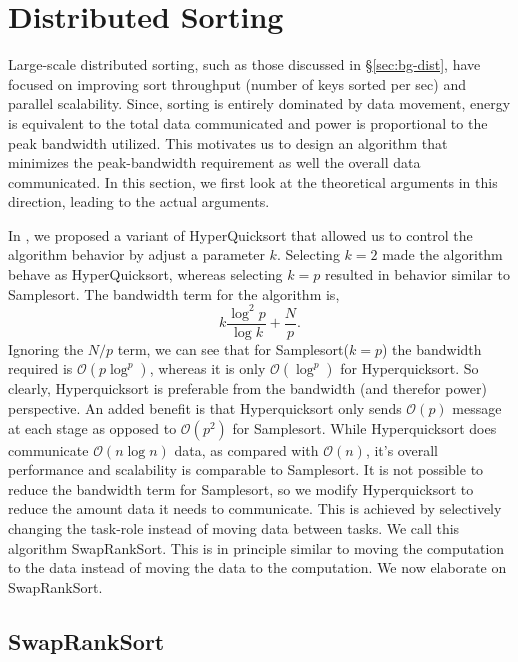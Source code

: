 \section{Distributed Sorting}
\label{sec:dsort}

Large-scale distributed sorting, such as those discussed in \S\ref{sec:bg-dist}, have focused on improving sort throughput (number of keys sorted per sec) and parallel scalability. Since, sorting is entirely dominated by data movement, energy is equivalent to the total data communicated and power is proportional to the peak bandwidth utilized. This motivates us to design an algorithm that minimizes the peak-bandwidth requirement as well the overall data communicated. In this section, we first look at the theoretical arguments in this direction, leading to the actual arguments. 

In \cite{hyksort}, we proposed a variant of HyperQuicksort\cite{wagar87} that allowed us to control the algorithm behavior by adjust a parameter $k$. Selecting $k=2$ made the algorithm behave as HyperQuicksort, whereas selecting $k=p$ resulted in behavior similar to Samplesort. The bandwidth term for the algorithm is,
\begin{equation}
  \label{eq:bw}
    k \frac{\log^2 p}{\log k} + \frac{N}{p}.
\end{equation}   
Ignoring the $N/p$ term, we can see that for Samplesort($k=p$) the bandwidth required is $\mathcal{O}(p\log^ p)$, whereas it is only $\mathcal{O}(\log^ p)$ for Hyperquicksort. So clearly, Hyperquicksort is preferable from the bandwidth (and therefor power) perspective. An added benefit is that Hyperquicksort only sends $\mathcal{O}(p)$ message at each stage as opposed to $\mathcal{O}(p^2)$ for Samplesort. While Hyperquicksort does communicate $\mathcal{O}(n\log n)$ data, as compared with $\mathcal{O}(n)$, it's overall performance and scalability is comparable to Samplesort\cite{hyksort}. It is not possible to reduce the bandwidth term for Samplesort, so we modify Hyperquicksort to reduce the amount data it needs to communicate. This is achieved by selectively changing the task-role instead of moving data between tasks. We call this algorithm {\sc SwapRankSort}. This is in principle similar to moving the computation to the data instead of moving the data to the computation. We now elaborate on {\sc SwapRankSort}.

\subsection{{\sc SwapRankSort}}

